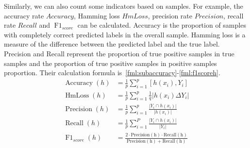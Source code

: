 Similarly, we can also count some indicators based on samples. For example, the accuracy rate \(Accuracy\), Hamming loss \(HmLoss\), precision rate \(Precision\), recall rate \(Recall\) and \(\operatorname{F1}_{score}\) can be calculated. Accuracy is the proportion of samples with completely correct predicted labels in the overall sample. Hamming loss is a measure of the difference between the predicted label and the true label. Precision and Recall represent the proportion of true positive samples in true samples and the proportion of true positive samples in positive samples proportion. Their calculation formula is~\ref{fml:subaccuracy}-\ref{fml:f1scoreh}.
\begin{align}
	\operatorname{Accuracy}(h)   & =\frac{1}{p} \sum_{i=1}^{p}[{h}(x_{i}), Y_{i}] \label{fml:subaccuracy}                                                                                \\
	\operatorname{HmLoss}(h)     & =\frac{1}{p} \sum_{i=1}^{p} \frac{1}{q}|h(x_{i}) \Delta Y_{i}| \label{fml:hmloss}                                                                     \\
	\operatorname{Precision}(h)  & =\frac{1}{p} \sum_{i=1}^{p} \frac{|Y_{i} \cap h(x_{i})|}{|h(x_{i})|} \label{fml:Precisionh}                                                           \\
	\operatorname{Recall}(h)     & =\frac{1}{p} \sum_{i=1}^{P} \frac{|Y_{i} \cap h(x_{i})|}{|Y_{i}|}    \label{fml:Recallh}                                                              \\
	\operatorname{F1}_{score}(h) & =\frac{2 \cdot \operatorname{Precision(h)} \cdot \operatorname{Recall(h)}}{\operatorname{Precision(h)}+\operatorname{Recall(h)}} \label{fml:f1scoreh}
\end{align}



